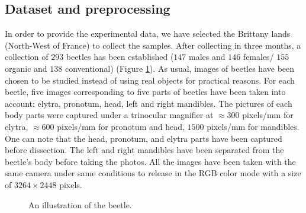 \documentclass[review]{elsarticle}
\begin{document}
\subsection{Dataset and preprocessing}
\label{subsec21}
In order to provide the experimental data, we have selected the Brittany lands (North-West of France) to collect the samples. After collecting in three months, a collection of $293$ beetles has been established ($147$ males and $146$ females/ $155$ organic and $138$ conventional) (Figure \ref{imgbeetle}). As usual, images of beetles have been chosen to be studied instead of using real objects for practical reasons. For each beetle, five images corresponding to five parts of beetles have been taken into account: elytra, pronotum, head, left and right mandibles. The pictures of each body parts were captured under a trinocular magnifier at $\approx 300$ pixels/mm for elytra, $\approx 600$ pixels/mm for pronotum and head, $1500$ pixels/mm for mandibles. One can note that the head, pronotum, and elytra parts have been captured before dissection. The left and right mandibles have been separated from the beetle's body before taking the photos. All the images have been taken with the same camera under same conditions to release in the RGB color mode with a size of $3264 \times 2448$ pixels.

\begin{figure}[h!]
	\centering
	\caption{An illustration of the beetle.}
	\label{imgbeetle}
\end{figure}
\end{document}

